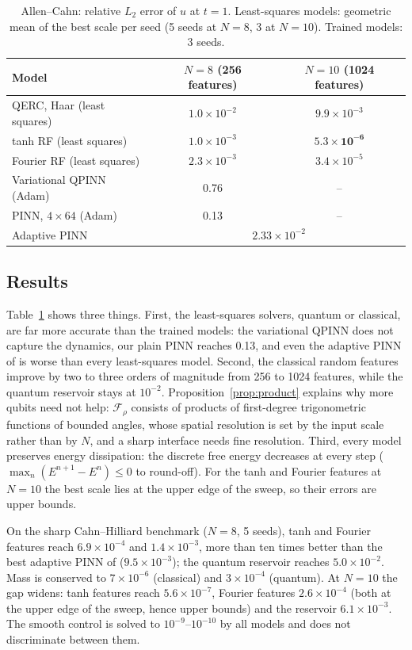 \documentclass[11pt]{article}
\theoremstyle{remark}\newtheorem*{remark}{Remark}
\begin{document}
\begin{table}[t]
  \centering
  \caption{Allen--Cahn: relative $L_2$ error of $u$ at $t=1$. Least-squares models: geometric mean of the best scale per
           seed (5 seeds at $N=8$, 3 at $N=10$). Trained models: 3 seeds.}
  \label{tab:ac}
  \begin{tabular}{lcc}
    \toprule
    Model & $N=8$ (256 features) & $N=10$ (1024 features) \\
    \midrule
    QERC, Haar (least squares)    & $1.0\times10^{-2}$ & $9.9\times10^{-3}$ \\
    tanh RF (least squares)       & $1.0\times10^{-3}$ & $\bm{5.3\times10^{-6}}$ \\
    Fourier RF (least squares)    & $2.3\times10^{-3}$ & $3.4\times10^{-5}$ \\
    \midrule
    Variational QPINN (Adam)      & 0.76 & -- \\
    PINN, $4\times64$ (Adam)      & 0.13 & -- \\
    Adaptive PINN \citep{wight2021adaptive} & \multicolumn{2}{c}{$2.33\times10^{-2}$} \\
    \bottomrule
  \end{tabular}
\end{table}

\subsection{Results}
Table~\ref{tab:ac} shows three things. First, the least-squares solvers, quantum or classical, are far more accurate
than the trained models: the variational QPINN does not capture the dynamics, our plain PINN reaches 0.13, and even the
adaptive PINN of \citet{wight2021adaptive} is worse than every least-squares model.
Second, the classical random features improve by two to three orders of magnitude from 256 to 1024 features, while the
quantum reservoir stays at $10^{-2}$. Proposition~\ref{prop:product} explains why more qubits need not help: $\mathcal F_\rho$
consists of products of first-degree trigonometric functions of bounded angles, whose spatial resolution is set by the
input scale rather than by $N$, and a sharp interface needs fine resolution. Third, every model preserves energy
dissipation: the discrete free energy decreases at every step ($\max_n(E^{n+1}-E^n)\le0$ to round-off).
For the tanh and Fourier features at $N=10$ the best scale lies at the upper edge of the sweep, so their errors are
upper bounds.

On the sharp Cahn--Hilliard benchmark ($N=8$, 5 seeds), tanh and Fourier features reach $6.9\times10^{-4}$ and
$1.4\times10^{-3}$, more than ten times better than the best adaptive PINN of \citet{wight2021adaptive} ($9.5\times10^{-3}$);
the quantum reservoir reaches $5.0\times10^{-2}$. Mass is conserved to $7\times10^{-6}$ (classical) and $3\times10^{-4}$
(quantum). At $N=10$ the gap widens: tanh features reach $5.6\times10^{-7}$, Fourier features
$2.6\times10^{-4}$ (both at the upper edge of the sweep, hence upper bounds) and the reservoir $6.1\times10^{-3}$.
The smooth control is solved to $10^{-9}$--$10^{-10}$ by all models and does not discriminate between them.
\end{document}
